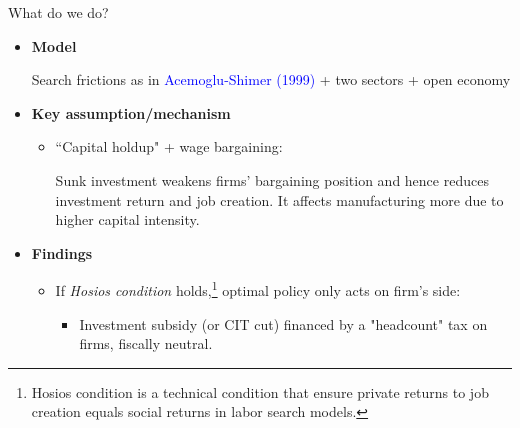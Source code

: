 \documentclass[9pt,xcolor={svgnames}]{beamer}
\begin{document}
\begin{frame}{What do we do?}\label{main:summary1}
\begin{itemize}

  \item \textbf{Model}

  Search frictions as in \textcolor{blue}{Acemoglu-Shimer (1999)} + two sectors + open economy 

\vspace{2mm}

\item \textbf{Key assumption/mechanism}

\begin{itemize}
    \item ``Capital holdup" + wage bargaining: 
    
    Sunk investment  weakens firms' bargaining position and hence reduces investment return and job creation.
    It affects manufacturing more due to higher capital intensity. 
\end{itemize}

\vspace{2mm}

  \item \textbf{Findings}
    \begin{itemize}
      \item If \textit{Hosios condition} holds,\footnote{Hosios condition is a technical condition that ensure private returns to job creation equals social returns in labor search models.} optimal policy only acts on firm's side:
      \begin{itemize}
          
          \item Investment subsidy (or CIT cut) financed by a "headcount" tax on firms, {fiscally neutral}. %
      \end{itemize}


\end{itemize}
\end{itemize}
\end{frame}
\end{document}
